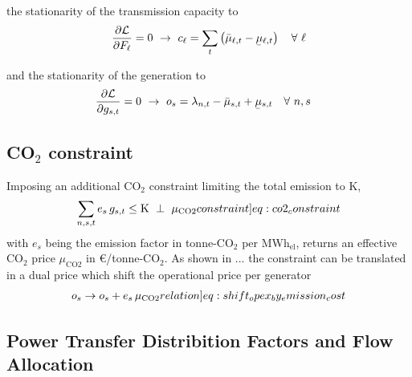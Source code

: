 \documentclass[11pt,twocolumn]{article}
\newcommand{\ubar}[1]{\underaccent{\bar}{#1}}
\newcommand{\resultsin}[1]{\hspace{6pt} \bot  \hspace{6pt} #1}
\newcommand{\Forall}[1]{\hspace{10pt} \forall \,\, #1 }
\newcommand{\pdv}[2]{\frac{\partial #1}{\partial #2}}
\newcommand{\generation}{g_{s,t}}
\newcommand{\capacityGeneration}{G_{s}}
\newcommand{\capacityFlow}{F_{\ell}}
\newcommand{\capexGeneration}{c_{s}}
\newcommand{\capexFlow}{c_{\ell}}
\newcommand{\opexGeneration}{o_{s}}
\newcommand{\mulowergeneration}{\ubar{\mu}_{s,t}}
\newcommand{\muuppergeneration}{\bar{\mu}_{s,t}}
\newcommand{\mulowerflow}{\ubar{\mu}_{\ell,t}}
\newcommand{\muupperflow}{\bar{\mu}_{\ell,t}}
\newcommand{\lmp}[1][n]{\lambda_{#1,t}}
\newcommand{\lagrangian}{\mathcal{L}}
\newcommand{\emission}{e_{s}}
\newcommand{\emissionPrice}{\mu_{\text{CO2}}}
\newcommand{\megawatthour}{MWh$_\text{el}$}
\begin{document}
the stationarity of the transmission capacity to
\begin{align}
\pdv{\lagrangian}{\capacityFlow} = 0 \,\, \rightarrow \,\, 
\capexFlow =  \sum_t \left( \muupperflow - \mulowerflow \right) \Forall{\ell}
\label{eq:capexFlow_duality}
\end{align}


and the stationarity of the generation to 
\begin{align}
\pdv{\lagrangian}{\generation} &= 0 \,\, \rightarrow \,\,  
\opexGeneration =  \lmp - \muuppergeneration + \mulowergeneration \Forall{n,s} \label{eq:opex_duality}
\end{align}

\subsection{CO$_2$ constraint}

Imposing an additional CO$_2$ constraint limiting the total emission to K,  
\begin{align}
\sum_{n,s,t} \emission \, \generation \le \text{K} \resultsin{\emissionPrice} 
\label[constraint]{eq:co2_constraint}
\end{align}
with $\emission$ being the emission factor in tonne-CO$_2$ per \megawatthour, returns an effective CO$_2$ price $\emissionPrice$ in \euro/tonne-CO$_2$. 
% 
As shown in ... the constraint can be translated in a dual price which shift the operational price per generator
\begin{align}
\opexGeneration \rightarrow \opexGeneration + \emission \, \emissionPrice \label[relation]{eq:shift_opex_by_emission_cost}
\end{align}


\subsection{Power Transfer Distribition Factors and Flow Allocation}
\label{sec:ptdf_and_flow_allocation}
\end{document}
